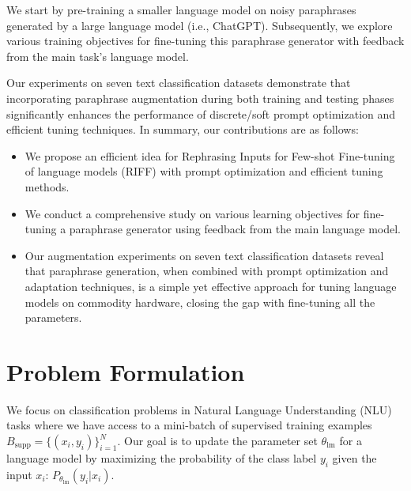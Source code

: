\documentclass[11pt]{article}
\begin{document}
We start by pre-training a smaller language model on noisy paraphrases generated by a large language model (i.e., ChatGPT). Subsequently, we explore various training objectives for fine-tuning this paraphrase generator with feedback from the main task's language model.

Our experiments on seven text classification datasets demonstrate that incorporating paraphrase augmentation during both training and testing phases significantly enhances the performance of discrete/soft prompt optimization and efficient tuning techniques. In summary, our contributions are as follows:
\begin{itemize}
\item We propose an efficient idea for Rephrasing Inputs for Few-shot Fine-tuning of language models (RIFF) with prompt optimization and efficient tuning methods.
\item We conduct a comprehensive study on various learning objectives for fine-tuning a paraphrase generator using feedback from the main language model.
\item Our augmentation experiments on seven text classification datasets reveal that paraphrase generation, when combined with prompt optimization and adaptation techniques, is a simple yet effective approach for tuning language models on commodity hardware, closing the gap with fine-tuning all the parameters.
\end{itemize}

\section{Problem Formulation}
We focus on classification problems in Natural Language Understanding (NLU) tasks where we have access to a mini-batch of supervised training examples $B_{\text{supp}} = \{(x_i, y_i)\}_{i=1}^{N}$. Our goal is to update the parameter set $\theta_{\text{lm}}$ for a language model by maximizing the probability of the class label $y_i$ given the input $x_i$: $P_{\theta_{\text{lm}}} (y_i | x_i)$. 
\end{document}
